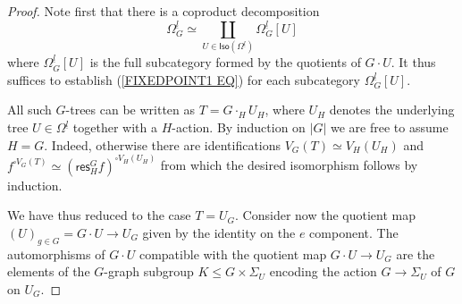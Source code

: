 \documentclass[a4paper,10pt]{article}%
\begin{document}
\begin{proof}
Note first that there is a coproduct decomposition
\[\Omega_{G}^{\underline{l}}
\simeq \coprod_{U \in \mathsf{Iso}
\left(\Omega^{\underline{l}}\right)}
\Omega_{G}^{\underline{l}}[U]\]
where $\Omega_{G}^{\underline{l}}[U]$ is the full subcategory
formed by the quotients of $G \cdot U$.
It thus suffices to establish (\ref{FIXEDPOINT1 EQ}) for each subcategory 
$\Omega_{G}^{\underline{l}}[U]$. 

All such $G$-trees can be written as 
$T = G \cdot_H U_H$,
where $U_H$ denotes the underlying tree
$U \in \Omega^{\underline{l}}$
together with a $H$-action. 
By induction on 
$|G|$ we are free 
 to assume $H=G$.
Indeed, otherwise there are identifications
$V_G(T) \simeq V_H(U_H)$ and 
$f^{\square V_G(T)}\simeq (\mathsf{res}^G_H f)^{\square V_H(U_H)}$ from which the desired isomorphism follows by induction.

We have thus reduced to the case 
$T=U_G$.
Consider now the quotient map
$(U)_{g\in G} = G \cdot U \to U_G$ given by the identity on the $e$ component.
The automorphisms of $G \cdot U$ compatible with the quotient map $G \cdot U \to U_G$
are the elements of the
$G$-graph subgroup $K \leq G \times \Sigma_U$
encoding the action $G \to \Sigma_U$ of $G$ on $U_G$.


\end{proof}
\end{document}
